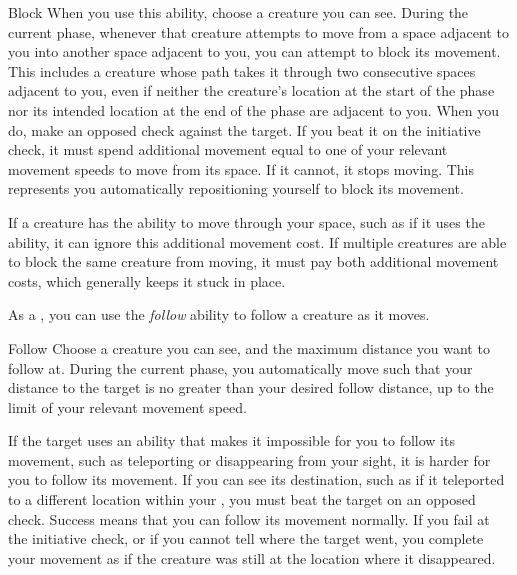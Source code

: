         \begin{activeability}{Block}
            \rankline
            When you use this ability, choose a creature you can see.
            During the current phase, whenever that creature attempts to move from a space adjacent to you into another space adjacent to you, you can attempt to block its movement.
            This includes a creature whose path takes it through two consecutive spaces adjacent to you, even if neither the creature's location at the start of the phase nor its intended location at the end of the phase are adjacent to you.
            When you do, make an opposed  check against the target.
            If you beat it on the initiative check, it must spend additional movement equal to one of your relevant movement speeds to move from its space.
            If it cannot, it stops moving.
            This represents you automatically repositioning yourself to block its movement.

            If a creature has the ability to move through your space, such as if it uses the  ability, it can ignore this additional movement cost.
            If multiple creatures are able to block the same creature from moving, it must pay both additional movement costs, which generally keeps it stuck in place.
        \end{activeability}

        \label{Follow} As a , you can use the \textit{follow} ability to follow a creature as it moves.

        \begin{activeability}{Follow}
            \rankline
            Choose a creature you can see, and the maximum distance you want to follow at.
            During the current phase, you automatically move such that your distance to the target is no greater than your desired follow distance, up to the limit of your relevant movement speed.

            If the target uses an ability that makes it impossible for you to follow its movement, such as teleporting or disappearing from your sight, it is harder for you to follow its movement.
            If you can see its destination, such as if it teleported to a different location within your , you must beat the target on an opposed  check.
            Success means that you can follow its movement normally.
            If you fail at the initiative check, or if you cannot tell where the target went, you complete your movement as if the creature was still at the location where it disappeared.
        \end{activeability}

